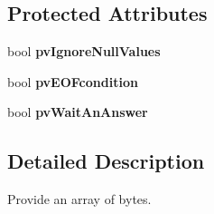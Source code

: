 \subsection*{Protected Attributes}
\begin{DoxyCompactItemize}
\item 
\hypertarget{classmdt_frame_a883c4de8f2c961310366d5a72b6e6dd8}{
bool {\bfseries pvIgnoreNullValues}}
\label{classmdt_frame_a883c4de8f2c961310366d5a72b6e6dd8}

\item 
\hypertarget{classmdt_frame_a1862e197bad6e9887cfedc54a768e88d}{
bool {\bfseries pvEOFcondition}}
\label{classmdt_frame_a1862e197bad6e9887cfedc54a768e88d}

\item 
\hypertarget{classmdt_frame_aac030954a872c41f7fb917912e16a77f}{
bool {\bfseries pvWaitAnAnswer}}
\label{classmdt_frame_aac030954a872c41f7fb917912e16a77f}

\end{DoxyCompactItemize}


\subsection{Detailed Description}
Provide an array of bytes. 

